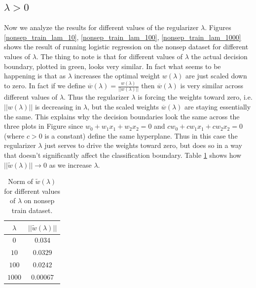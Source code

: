 \documentclass[10pt]{article}
\begin{document}
\subsection{$\lambda > 0$}
Now we analyze the results for different values of the regularizer $\lambda$. Figures \ref{nonsep_train_lam_10}, \ref{nonsep_train_lam_100}, \ref{nonsep_train_lam_1000} shows the result of running logistic regression on the nonsep dataset for different values of $\lambda$. The thing to note is that for different values of $\lambda$ the actual decision boundary, plotted in green, looks very similar. In fact what seems to be happening is that as $\lambda$ increases the optimal weight $w(\lambda)$ are just scaled down to zero. In fact if we define $\overline{w}(\lambda) = \frac{w(\lambda)}{||w(\lambda)||}$ then $\overline{w}(\lambda)$ is very similar across different values of $\lambda$. Thus the regularizer $\lambda$ is forcing the weights toward zero, i.e. $||w(\lambda)||$ is decreasing in $\lambda$, but the scaled weights $\overline{w}(\lambda)$ are staying essentially the same. This explains why the decision boundaries look the same across the three plots in Figure  since $w_0 + w_1 x_1 + w_2 x_2 = 0$ and $c w_0 + c w_1 x_1 + c w_2 x_2 = 0$ (where $c > 0$ is a constant) define the same hyperplane. Thus in this case the regularizer $\lambda$ just serves to drive the weights toward zero, but does so in a way that doesn't significantly affect the classification boundary. Table \ref{w_lam_norm} shows how $||\tilde{w}(\lambda)|| \to 0$ as we increase $\lambda$.

\begin{table}[H]
\begin{tabular}{|c|c|}
\hline
$\lambda$ & $||\tilde{w}(\lambda)||$\\ \hline
$0$ & $0.034$ \\ \hline
$10$ & $0.0329$ \\ \hline
$100$ & $0.0242$ \\ \hline
$1000$ & $0.00067$ \\ \hline
\end{tabular}
\label{w_lam_norm}
\caption{Norm of $\tilde{w}(\lambda)$ for different values of $\lambda$ on nonsep train dataset.}
\end{table}
\end{document}
